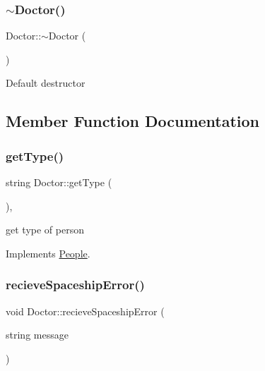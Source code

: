 \subsubsection{\texorpdfstring{$\sim$\+Doctor()}{~Doctor()}}
{\footnotesize\ttfamily Doctor\+::$\sim$\+Doctor (\begin{DoxyParamCaption}{ }\end{DoxyParamCaption})\hspace{0.3cm}{\ttfamily [inline]}}

Default destructor 

\subsection{Member Function Documentation}
\mbox{\label{classDoctor_a6aee07e1096c01e16c11b461150083eb}} 
\subsubsection{\texorpdfstring{get\+Type()}{getType()}}
{\footnotesize\ttfamily string Doctor\+::get\+Type (\begin{DoxyParamCaption}{ }\end{DoxyParamCaption})\hspace{0.3cm}{\ttfamily [inline]}, {\ttfamily [virtual]}}

get type of person 

Implements \hyperlink{classPeople_af60dd882d60cddf63f9b95815ce551a8}{People}.

\mbox{\label{classDoctor_a820dca3b9f05d3f69c47bd7318923b88}} 
\subsubsection{\texorpdfstring{recieve\+Spaceship\+Error()}{recieveSpaceshipError()}}
{\footnotesize\ttfamily void Doctor\+::recieve\+Spaceship\+Error (\begin{DoxyParamCaption}\item[{string}]{message }\end{DoxyParamCaption})\hspace{0.3cm}{\ttfamily [virtual]}}

